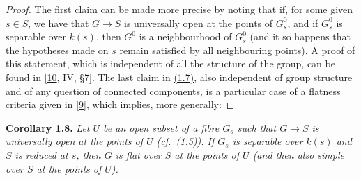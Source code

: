\documentclass{article}
\newenvironment{itenv}[1]
  {\phantomsection\par\smallskip\noindent\textbf{#1.}\itshape}
  {\par\smallskip}
\theoremstyle{definition}
\theoremstyle{definition}
\theoremstyle{definition}
\theoremstyle{definition}
\theoremstyle{remark}
\begin{document}
\begin{proof}
The first claim can be made more precise by noting that if, for some given \(s\in S\), we have that \(G\to S\) is universally open at the points of \(G_s^0\), and if \(G_s^0\) is separable over \(k(s)\), then \(G^0\) is a neighbourhood of \(G_s^0\) (and it so happens that the hypotheses made on \(s\) remain satisfied by all neighbouring points).
A proof of this statement, which is independent of all the structure of the group, can be found in {[}\protect\hyperlink{ref-GD1960}{10}, IV, §7{]}.
The last claim in \protect\hyperlink{fga-3-vi-corollary-1.7}{(1.7)}, also independent of group structure and of any question of connected components, is a particular case of a flatness criteria given in {[}\protect\hyperlink{ref-Gro1960b}{9}{]}, which implies, more generally:
\end{proof}

\leavevmode{}%
\begin{itenv}{Corollary 1.8}
Let \(U\) be an open subset of a fibre \(G_s\) such that \(G\to S\) is universally open at the points of \(U\) (cf.~\protect\hyperlink{fga-3-vi-corollary-1.5}{(1.5)}).
If \(G_s\) is separable over \(k(s)\) and \(S\) is reduced at \(s\), then \(G\) is flat over \(S\) at the points of \(U\) (and then also simple over \(S\) at the points of \(U\)).

\end{itenv}
\end{document}
